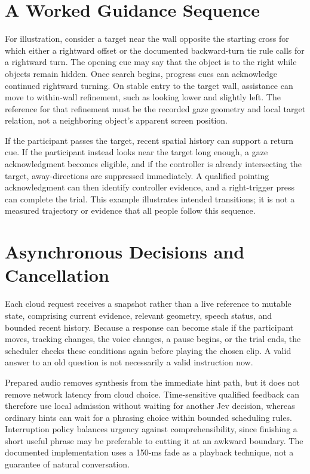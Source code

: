 \section{A Worked Guidance Sequence}
For illustration, consider a target near the wall opposite the starting cross for which either a rightward offset or the documented backward-turn tie rule calls for a rightward turn. The opening cue may say that the object is to the right while objects remain hidden. Once search begins, progress cues can acknowledge continued rightward turning. On stable entry to the target wall, assistance can move to within-wall refinement, such as looking lower and slightly left. The reference for that refinement must be the recorded gaze geometry and local target relation, not a neighboring object's apparent screen position.

If the participant passes the target, recent spatial history can support a return cue. If the participant instead looks near the target long enough, a gaze acknowledgment becomes eligible, and if the controller is already intersecting the target, away-directions are suppressed immediately. A qualified pointing acknowledgment can then identify controller evidence, and a right-trigger press can complete the trial. This example illustrates intended transitions; it is not a measured trajectory or evidence that all people follow this sequence.

\section{Asynchronous Decisions and Cancellation}
Each cloud request receives a snapshot rather than a live reference to mutable state, comprising current evidence, relevant geometry, speech status, and bounded recent history. Because a response can become stale if the participant moves, tracking changes, the voice changes, a pause begins, or the trial ends, the scheduler checks these conditions again before playing the chosen clip. A valid answer to an old question is not necessarily a valid instruction now.

Prepared audio removes synthesis from the immediate hint path, but it does not remove network latency from cloud choice. Time-sensitive qualified feedback can therefore use local admission without waiting for another Jev decision, whereas ordinary hints can wait for a phrasing choice within bounded scheduling rules. Interruption policy balances urgency against comprehensibility, since finishing a short useful phrase may be preferable to cutting it at an awkward boundary. The documented implementation uses a 150-ms fade as a playback technique, not a guarantee of natural conversation.

